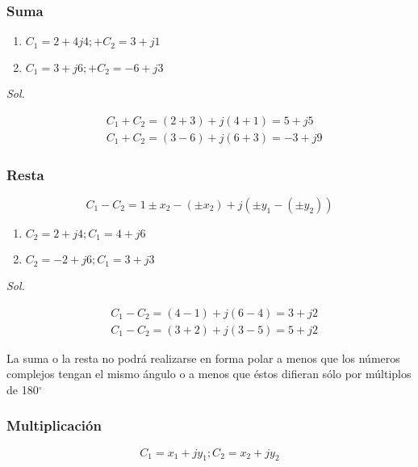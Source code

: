 \subsubsection{Suma}

\begin{enumerate}
	\item $C_{1}=2+4j4; + C_{2}=3+j1$
	\item $C_{1}=3+j6; + C_{2}=-6+j3$
\end{enumerate}

\textit{Sol. }

\begin{align*}
	 & C_{1}+C_{2}=\left(2+3\right)+j\left(4+1\right)=5+j5  \\
	 & C_{1}+C_{2}=\left(3-6\right)+j\left(6+3\right)=-3+j9
\end{align*}

\subsubsection{Resta}

\begin{equation}
	C_{1}-C_{2}=1\pm x_{2}-\left(\pm x_{2}\right)+j\left(\pm y_{1}-\left(\pm y_{2}\right)\right)
\end{equation}

\begin{enumerate}
	\item $C_{2}=2+j4; C_{1}=4+j6$
	\item $C_{2}=-2+j6; C_{1}=3+j3$
\end{enumerate}

\textit{Sol. }

\begin{align*}
	 & C_{1}-C_{2}=\left(4-1\right)+j\left(6-4\right)=3+j2 \\
	 & C_{1}-C_{2}=\left(3+2\right)+j\left(3-5\right)=5+j2
\end{align*}

La suma o la resta no podrá realizarse en forma polar a menos que los números complejos tengan el mismo ángulo o a menos que éstos difieran sólo por múltiplos de 180$^{\circ}$

\subsubsection{Multiplicación}

\begin{equation*}
	C_{1}=x_{1}+jy_{1}; C_{2}=x_{2}+jy_{2}
\end{equation*}


